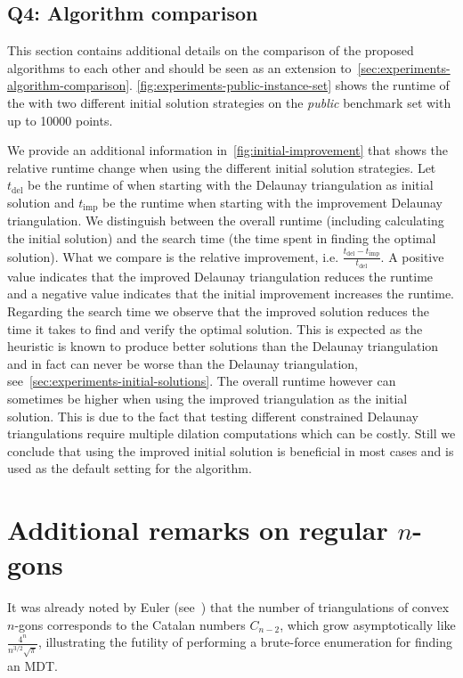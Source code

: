 \subsection{Q4: Algorithm comparison}
\label{sec:appendix-algorithm-comparison}

This section contains additional details on the comparison of the proposed algorithms to each other and should be seen as an extension to~\cref{sec:experiments-algorithm-comparison}.
\cref{fig:experiments-public-instance-set} shows the runtime of the \binmdt{} with two different initial solution strategies on the \emph{public} benchmark set with up to \num{10000} points.

We provide an additional information in~\cref{fig:initial-improvement} that shows the relative runtime change when using the different initial solution strategies.
Let $t_{\mathrm{del}}$ be the runtime of \binmdt{} when starting with the Delaunay triangulation as initial solution and $t_{\mathrm{imp}}$ be the runtime when starting with the improvement Delaunay triangulation.
We distinguish between the overall runtime (including calculating the initial solution) and the search time (the time spent in finding the optimal solution).
What we compare is the relative improvement, i.e. $\frac{t_{\mathrm{del}}-t_{\mathrm{imp}}}{t_{\mathrm{del}}}$.
A positive value indicates that the improved Delaunay triangulation reduces the runtime and a negative value indicates that the initial improvement increases the runtime.
Regarding the search time we observe that the improved solution reduces the time it takes to find and verify the optimal solution. This is expected as the heuristic is known to produce better solutions than the Delaunay triangulation and in fact can never be worse than the Delaunay triangulation, see~\cref{sec:experiments-initial-solutions}.
The overall runtime however can sometimes be higher when using the improved triangulation as the initial solution. This is due to the fact that testing different constrained Delaunay triangulations require multiple dilation computations which can be costly.
Still we conclude that using the improved initial solution is beneficial in most cases and is used as the default setting for the \binmdt{} algorithm.

\section{Additional remarks on regular \texorpdfstring{$n$}{n}-gons}
\label{sec:appendix-n-gons}
It was already noted by Euler (see~\cite{stanley2015catalan}) that the number of triangulations of convex $n$-gons corresponds to the Catalan numbers
$C_{n-2}$, which grow asymptotically like $\frac{4^n}{n^{3/2}\sqrt{\pi}}$, illustrating the futility of performing 
a brute-force enumeration for finding an MDT. 

